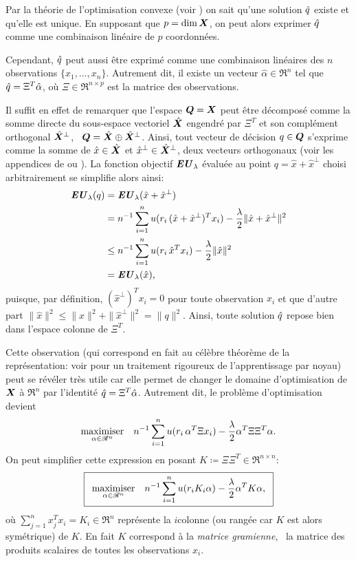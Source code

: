Par la théorie de l'optimisation convexe (voir \cite{boyd2004convex}) on sait qu'une
solution $\qh$ existe et qu'elle est unique. En supposant que $p = \dim\X$, on peut alors
exprimer $\qh$ comme une combinaison linéaire de $p$ coordonnées.

Cependant, $\qh$ peut aussi être exprimé comme une combinaison linéaires des $n$
observations $\{x_1,\ldots,x_n\}$. Autrement dit, il existe un vecteur
$\hat\alpha \in \Re^n$ tel que $\qh = \Xi^T\hat\alpha$, où $\Xi \in \Re^{n \times p}$ est la matrice des
observations.

Il suffit en effet de remarquer que l'espace $\Q = \X$ peut être décomposé comme la somme
directe du sous-espace vectoriel $\hat\X$ engendré par $\Xi^T$ et son complément orthogonal
$\hat\X^\perp$, \ie\ $\Q = \hat\X \oplus \hat\X^\perp$. Ainsi, tout vecteur de décision
$q \in \Q$ s'exprime comme la somme de $\hat x\in\hat\X$ et
$\hat x^\perp \in \hat\X^\perp$, deux vecteurs orthogonaux (voir les appendices de
\cite{boyd2004convex} ou \cite{mohri2012foundations}). La fonction objectif $\EU_\lambda$
évaluée au point $q = \hat x + \hat x^\perp$ choisi arbitrairement se simplifie alors ainsi:
\begin{align}
  \EU_\lambda(q) &= \EU_\lambda(\hat x + \hat x^\perp)\\
           &= n^{-1}\sumi u(r_i\,(\hat x + \hat x^\perp)^Tx_i) - \frac{\lambda}{2}\|\hat x + \hat
             x^\perp\|^2\\
           &\leq n^{-1}\sumi u(r_i\,\hat x^Tx_i) - \frac{\lambda}{2}\|\hat x\|^2\\
           &=\EU_\lambda(\hat x),
\end{align}
puisque, par définition, $(\hat x^\perp)^Tx_i = 0$ pour toute observation $x_i$ et que d'autre
part $\|\hat x\|^2 \leq \|\hat x\|^2+\|\hat x^\perp\|^2 = \|q\|^2$. Ainsi, toute solution
$\qh$ repose bien dans l'espace colonne de $\Xi^T$.

Cette observation (qui correspond en fait au célèbre théorème de la représentation: voir
\cite{scholkopf2001learning} pour un traitement rigoureux de l'apprentissage par noyau)
peut se révéler très utile car elle permet de changer le domaine d'optimisation de $\X$ à
$\Re^n$ par l'identité $\qh = \Xi^T\hat\alpha$. Autrement dit, le problème d'optimisation devient
\begin{equation}
  \maximizeEquation[\alpha \in \Re^n]{n^{-1}\sumi u(r_i\,\alpha^T\Xi x_i) - \frac{\lambda}{2}\alpha^T\Xi\Xi^T\alpha.}
\end{equation}
On peut simplifier cette expression en posant $K \coloneqq \Xi\Xi^T \in \Re^{n \times n}$:
{\begin{equation}
  \boxed{
  \maximizeEquation[\alpha \in \Re^n]{n^{-1}\sumi u(r_iK_i\alpha) - \frac{\lambda}{2}\alpha^TK\alpha,}}
\end{equation}
\vspace{-\baselineskip}}
où $\sum_{j=1}^nx_j^Tx_i = K_i \in \Re^n$ représente la $i$\ieme colonne (ou rangée car
$K$ est alors symétrique) de $K$. En fait $K$ correspond à la \textit{matrice gramienne},
\ie\ la matrice des produits scalaires de toutes les observations $x_i$.


